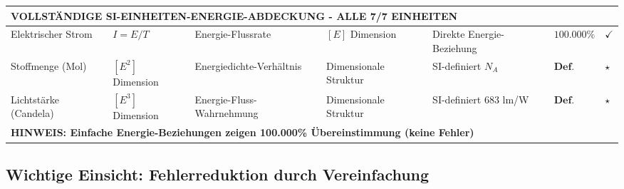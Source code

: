 \documentclass[12pt,a4paper]{article}
\begin{document}
\begin{landscape}
\begin{longtable}{p{3.5cm}p{2cm}p{2.5cm}p{4cm}p{3cm}p{1.8cm}p{1cm}}
		\multicolumn{7}{l}{\textbf{VOLLSTÄNDIGE SI-EINHEITEN-ENERGIE-ABDECKUNG - ALLE 7/7 EINHEITEN}} \\
		\midrule
		
		Elektrischer Strom & $I = E/T$ & Energie-Flussrate & $[E]$ Dimension & Direkte Energie-Beziehung & $\mathbf{100.000\%}$ & $\checkmark$ \\
		
		Stoffmenge (Mol) & $[E^2]$ Dimension & Energiedichte-Verhältnis & Dimensionale Struktur & SI-definiert $N_A$ & $\mathbf{Def.}$ & $\star$ \\
		
		Lichtstärke (Candela) & $[E^3]$ Dimension & Energie-Fluss-Wahrnehmung & Dimensionale Struktur & SI-definiert 683 lm/W & $\mathbf{Def.}$ & $\star$ \\
		
		\multicolumn{7}{l}{\textbf{HINWEIS: Einfache Energie-Beziehungen zeigen 100.000\% Übereinstimmung (keine Fehler)}} \\
		
	\end{longtable}
	\normalsize
		\end{landscape}
	\subsection{Wichtige Einsicht: Fehlerreduktion durch Vereinfachung}
	
\end{document}
